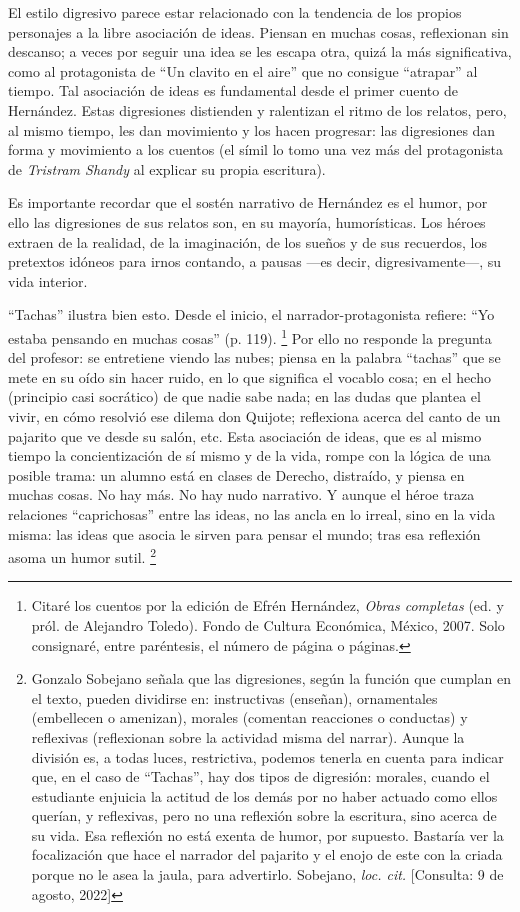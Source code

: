 \documentclass[14pt,twoside,final]{extbook} %
\let\oldfootnote\footnote
\renewcommand\footnote[1]{%
\oldfootnote{\hspace{1mm}#1}}
\begin{document}
El estilo digresivo parece estar relacionado con la tendencia de los propios personajes a la libre asociación de ideas. Piensan en muchas cosas, reflexionan sin descanso; a veces por seguir una idea se les escapa otra, quizá la más significativa, como al protagonista de ``Un clavito en el aire'' que no consigue ``atrapar'' al tiempo. Tal asociación de ideas es fundamental desde el primer cuento de Hernández. Estas digresiones distienden y ralentizan el ritmo de los relatos, pero, al mismo tiempo, les dan movimiento y los hacen progresar: las digresiones dan forma y movimiento a los cuentos (el símil lo tomo una vez más del protagonista de \emph{Tristram Shandy} al explicar su propia escritura).

Es importante recordar que el sostén narrativo de Hernández es el humor, por ello las digresiones de sus relatos son, en su mayoría, humorísticas. Los héroes extraen de la realidad, de la imaginación, de los sueños y de sus recuerdos, los pretextos idóneos para irnos contando, a pausas ---es decir, digresivamente---, su vida interior.

``Tachas'' ilustra bien esto. Desde el inicio, el narrador-protagonista refiere: ``Yo estaba pensando en muchas cosas'' (p. 119).\footnote{Citaré los cuentos por la edición de Efrén Hernández, \emph{Obras completas} (ed. y pról. de Alejandro Toledo). Fondo de Cultura Económica,  México, 2007. Solo consignaré, entre paréntesis, el número de página o páginas.} Por ello no responde la pregunta del profesor: se entretiene viendo las nubes; piensa en la palabra ``tachas'' que se mete en su oído sin hacer ruido, en lo que significa el vocablo cosa; en el hecho (principio casi socrático) de que nadie sabe nada; en las dudas que plantea el vivir, en cómo resolvió ese dilema don Quijote; reflexiona acerca del canto de un pajarito que ve desde su salón, etc. Esta asociación de ideas, que es al mismo tiempo la concientización de sí mismo y de la vida, rompe con la lógica de una posible trama: un alumno está en clases de Derecho, distraído, y piensa en muchas cosas. No hay más. No hay nudo narrativo. Y aunque el héroe traza relaciones ``caprichosas'' entre las ideas, no las ancla en lo irreal, sino en la vida misma: las ideas que asocia le sirven para pensar el mundo; tras esa reflexión asoma un humor sutil.\footnote{Gonzalo Sobejano señala que las digresiones, según la función que cumplan en el texto, pueden dividirse en: instructivas (enseñan), ornamentales (embellecen o amenizan), morales (comentan reacciones o conductas) y reflexivas (reflexionan sobre la actividad misma del narrar). Aunque la división es, a todas luces, restrictiva, podemos tenerla en cuenta para indicar que, en el caso de ``Tachas'', hay dos tipos de digresión: morales, cuando el estudiante enjuicia la actitud de los demás por no haber actuado como ellos querían, y reflexivas, pero no una reflexión sobre la escritura, sino acerca de su vida. Esa reflexión no está exenta de humor, por supuesto. Bastaría ver la focalización que hace el narrador del pajarito y el enojo de este con la criada porque no le asea la jaula, para advertirlo. Sobejano, \emph{loc. cit.} [Consulta: 9 de agosto, 2022]}
\end{document}
